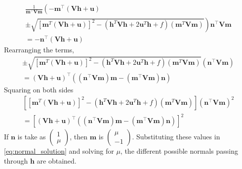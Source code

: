 \documentclass[journal,10pt,twocolumn]{article}
\let\vec\mathbf
\newcommand{\myvec}[1]{\ensuremath{\begin{pmatrix}#1\end{pmatrix}}}
\providecommand{\brak}[1]{\ensuremath{\left(#1\right)}}
\providecommand{\lbrak}[1]{\ensuremath{\left(#1\right.}}
\providecommand{\rbrak}[1]{\ensuremath{\left.#1\right)}}
\providecommand{\sbrak}[1]{\ensuremath{{}\left[#1\right]}}
\begin{document}
{\tiny
\begin{multline}
	\frac{1}{\vec{m}^\top\vec{V}\vec{m}}\lbrak{-\vec{m}^\top\brak{\vec{Vh}+\vec{u}}} \\ 
	\pm \rbrak{\sqrt{\sbrak{\vec{m}^T\brak{\vec{V}\vec{h}+\vec{u}}}^2-\brak{\vec{h}^T\vec{V}\vec{h} + 2\vec{u}^T\vec{h} +f}\brak{\vec{m}^T\vec{V}\vec{m}}}}\vec{n}^\top\vec{V}\vec{m} \\
	= -\vec{n}^\top\brak{\vec{Vh}+\vec{u}}
	\label{eq:normal_simp_3}
\end{multline}
}
Rearranging the terms,
{\tiny
\begin{multline}
	\pm \sqrt{\sbrak{\vec{m}^T\brak{\vec{V}\vec{h}+\vec{u}}}^2-\brak{\vec{h}^T\vec{V}\vec{h} + 2\vec{u}^T\vec{h} +f}\brak{\vec{m}^T\vec{V}\vec{m}}} \brak{\vec{n}^\top\vec{V}\vec{m}} \\ = \brak{\vec{Vh}+\vec{u}}^\top\brak{\brak{\vec{n}^\top\vec{V}\vec{m}}\vec{m}-\brak{\vec{m}^\top\vec{V}\vec{m}}\vec{n}}
\end{multline}
}
Squaring on both sides
{\tiny
\begin{multline}
	\sbrak{\sbrak{\vec{m}^T\brak{\vec{V}\vec{h}+\vec{u}}}^2-\brak{\vec{h}^T\vec{V}\vec{h} + 2\vec{u}^T\vec{h} +f}\brak{\vec{m}^T\vec{V}\vec{m}}}\brak{\vec{n}^\top\vec{V}\vec{m}}^2 \\ = \sbrak{\brak{\vec{Vh}+\vec{u}}^\top\brak{\brak{\vec{n}^\top\vec{V}\vec{m}}\vec{m}-\brak{\vec{m}^\top\vec{V}\vec{m}}\vec{n}}}^2
	\label{eq:normal_solution}
\end{multline}
}
If $\vec{n}$ is take as $\myvec{1 \\ \mu}$, then $\vec{m}$ is $\myvec{\mu \\ -1}$. Substituting these values in \eqref{eq:normal_solution} and solving for $\mu$, the different possible normals passing through $\vec{h}$ are obtained.
\end{document}
